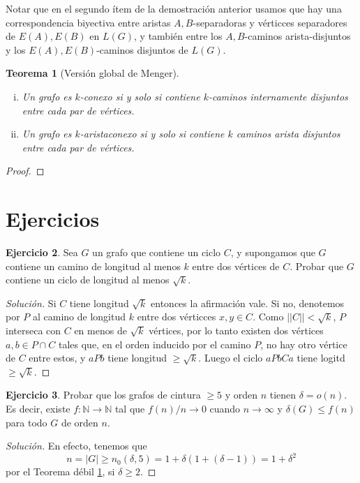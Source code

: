 \documentclass[12pt]{report}
\theoremstyle{plain}
\newtheorem{theorem}{Teorema}[section]
\theoremstyle{definition}
\newtheorem{exercise}[theorem]{Ejercicio}
\newenvironment{solution}{\begin{proof}[Solución]}{\end{proof}}
\newcommand{\naturals}{\mathbb{N}}
\newcommand{\abs}[1]{\left \vert #1 \right \vert}
\newcommand{\Abs}[1]{\left \vert \left \vert #1 \right \vert \right \vert}
\begin{document}
Notar que en el segundo ítem de la demostración anterior usamos que hay una correspondencia biyectiva entre aristas $A,B$-separadoras y vérticces separadores de $E(A),E(B)$ en $L(G)$, y también entre los $A,B$-caminos arista-disjuntos y los $E(A),E(B)$-caminos disjuntos de $L(G)$.

\begin{theorem}[Versión global de Menger]
\begin{enumerate}[(i)]
\item Un grafo es $k$-conexo si y solo si contiene $k$-caminos internamente disjuntos entre cada par de vértices.
\item Un grafo es $k$-aristaconexo si y solo si contiene $k$ caminos arista disjuntos entre cada par de vértices.
\end{enumerate}
\end{theorem}
\begin{proof}

\end{proof}





\section{Ejercicios}

\begin{exercise}
Sea $G$ un grafo que contiene un ciclo $C$, y supongamos que $G$ contiene un camino de longitud al menos $k$ entre
dos vértices de $C$. Probar que $G$ contiene un ciclo de longitud al menos $\sqrt k$.
\end{exercise}
\begin{solution}
    Si $C$ tiene longitud $\sqrt k$ entonces la afirmación vale. Si no, denotemos por $P$ al camino de longitud $k$
    entre dos vérticces $x,y \in C$. Como $\Abs C < \sqrt k$, $P$ interseca con $C$ en menos de $\sqrt k$ vértices,
    por lo tanto existen dos vértices $a,b \in P \cap C$ tales que, en el orden inducido por el camino $P$, no hay otro
    vértice de $C$ entre estos, y $a P b$ tiene longitud $\geq \sqrt k$. Luego el ciclo $a P b C a$ tiene logitd $\geq \sqrt k$.
\end{solution}


\begin{exercise}
Probar que los grafos de cintura $\geq 5$ y orden $n$ tienen $\delta = o (n)$. Es decir, existe $f : \naturals \rightarrow \naturals$ tal que $f(n) /n \rightarrow 0$ cuando $n \rightarrow \infty$ y $\delta (G) \leq f(n)$ para todo $G$ de orden $n$.
\end{exercise}
\begin{solution}
    En efecto, tenemos que
    $$
    n = \abs G \geq n_0 ( \delta, 5) = 1 + \delta (1 + (\delta -1)) = 1 + \delta^2
    $$
    por el Teorema débil \ref{}, si $\delta \geq 2$.
\end{solution}
\end{document}
